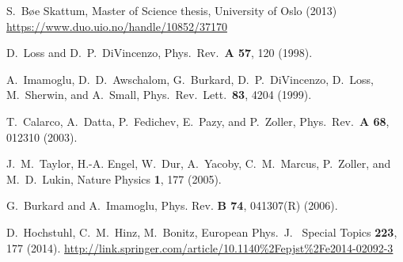 \begin{thebibliography}{999}

 S.~B\o e Skattum, Master of Science thesis, University of Oslo (2013) \url{https://www.duo.uio.no/handle/10852/37170}


D.~Loss and D.~P.~DiVincenzo, Phys.~Rev.~{\bf A 57}, 120 (1998).

A.~Imamoglu, D.~D.~Awschalom, G.~Burkard, D.~P.~DiVincenzo,
D.~Loss, M.~Sherwin, and A.~Small,
Phys.~Rev.~Lett.~{\bf 83}, 4204 (1999).

T.~Calarco, A.~Datta, P.~Fedichev, E.~Pazy, and P.~Zoller, Phys.~Rev.~{\bf A 68}, 012310 (2003).

J.~M.~Taylor, H.-A. Engel, W.~Dur, A.~Yacoby, C.~M.~Marcus,
P.~Zoller, and M.~D.~Lukin, 
Nature Physics {\bf 1}, 177 (2005).

G.~Burkard and A.~Imamoglu, Phys. Rev. {\bf B 74}, 041307(R) (2006).

 D.~Hochstuhl, C.~M.~Hinz, M.~Bonitz, 
European Phys.~J.~ Special Topics {\bf 223}, 177 (2014). \url{http://link.springer.com/article/10.1140%2Fepjst%2Fe2014-02092-3}




\end{thebibliography}







